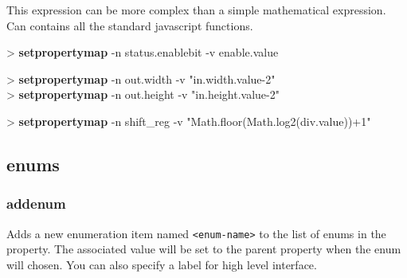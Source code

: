 \documentclass[10pt,a4paper]{article}
\begin{document}
{This expression can be more complex than a simple mathematical expression. Can contains all the standard javascript functions.\\


\begin{sampletitle}[1]
> \textbf{\tool{} setpropertymap} -n status.enablebit -v enable.value
\end{sampletitle}

\begin{sampletitle}[2]
> \textbf{\tool{} setpropertymap} -n out.width -v "in.width.value-2" \\
> \textbf{\tool{} setpropertymap} -n out.height -v "in.height.value-2"
\end{sampletitle}

\begin{sampletitle}[3]
> \textbf{\tool{} setpropertymap} -n shift\_reg -v "Math.floor(Math.log2(div.value))+1"
\end{sampletitle}

\subsection{enums}
\subsubsection{addenum}
\label{subsec:addenum}

Adds a new enumeration item named \texttt{<enum-name>} to the list of enums in the property. The associated value will be set to the parent property when the enum will chosen. You can also specify a label for high level interface.\\

}
\end{document}
